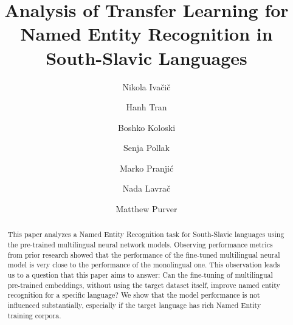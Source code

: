 \documentclass[sigconf]{acmart}
\begin{document}
\title{Analysis of Transfer Learning for Named Entity Recognition in South-Slavic Languages}

\author{Nikola Ivačič}


\author{Hanh Tran}
\author{Boshko Koloski}
\author{Senja Pollak}
\author{Marko Pranjić}
\author{Nada Lavrač}

\author{Matthew Purver}

\renewcommand{\shortauthors}{Ivačič et al.}

\begin{abstract}
  This paper analyzes a Named Entity Recognition task for South-Slavic languages using the pre-trained multilingual neural network models.
  Observing performance metrics from prior research showed that the performance of the fine-tuned multilingual neural model is very close to the performance of the monolingual one.
  This observation leads us to a question that this paper aims to answer: Can the fine-tuning of multilingual pre-trained embeddings, without using the target dataset itself, improve named entity recognition for a specific language?
  We show that the model performance is not influenced substantially, especially if the target language has rich Named Entity training corpora.
\end{abstract}
\end{document}
